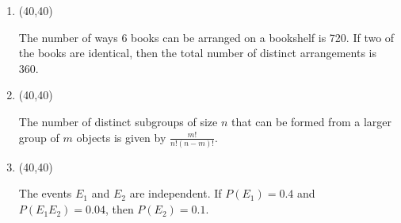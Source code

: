 \documentclass[11pt,twoside]{article}
\numberwithin{equation}{section}
\newcommand{\?}{\stackrel{?}{=}}
\newcommand{\fr}{\frac}
\newcommand{\gr}{\color{green!40!black}}
\begin{document}
\begin{enumerate}[\bf (i)]
  \smallskip
  \item \hfill
  \begin{minipage}{.1\linewidth}
    \framebox(40,40){\gr  }
  \end{minipage}\quad
  \begin{minipage}{.85\linewidth}
    The number of ways 6 books can be arranged on a bookshelf is 720. If two of the books are identical, then the total number of distinct arrangements is 360. %
  \end{minipage}
  
  \smallskip
  
\item \hfill
  \begin{minipage}{.1\linewidth}
    \framebox(40,40){\gr  }
  \end{minipage}\quad
  \begin{minipage}{.85\linewidth}
    The number of distinct subgroups of size $n$ that can be formed from a larger group of $m$ objects is given by $\fr{m!}{n!(n-m)!}$.
  \end{minipage}

  \smallskip

  \item \hfill
  \begin{minipage}{.1\linewidth}
    \framebox(40,40){\gr  }
  \end{minipage}\quad
  \begin{minipage}{.85\linewidth}
    The events $E_{1}$ and $E_{2}$ are independent. If $P(E_{1}) = 0.4$ and $P(E_{1}E_{2}) = 0.04$, then $P(E_{2}) = 0.1$.
  \end{minipage}
  \end{enumerate}
  
  
\end{document}
